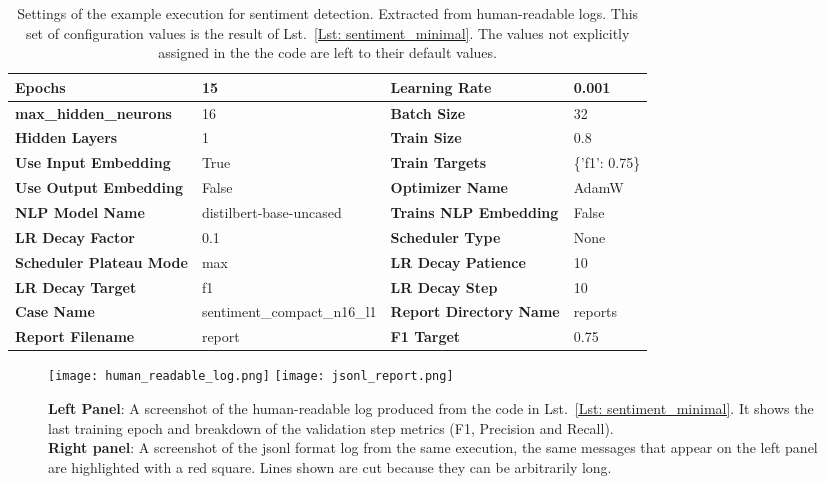 \documentclass[a4paper, 11pt]{report}
\begin{document}
\begin{table}[ht]
\footnotesize
\centering
\begin{tabular}{|p{4cm}|p{4cm}||p{4cm}|p{2.5cm}|}
\hline
\textbf{Epochs} & 15 & \textbf{Learning Rate} & 0.001 \\
\hline
\textbf{max\_hidden\_neurons} & 16 &\textbf{Batch Size} & 32 \\
\hline
\textbf{Hidden Layers }& 1 & \textbf{Train Size }& 0.8 \\
\hline
\textbf{Use Input Embedding} & True & \textbf{Train Targets} & \{'f1': 0.75\} \\
\hline
\textbf{Use Output Embedding} & False & \textbf{Optimizer Name} & AdamW \\
\hline
\textbf{NLP Model Name} & distilbert-base-uncased & \textbf{Trains NLP Embedding} & False \\
\hline
\textbf{LR Decay Factor} & 0.1 & \textbf{Scheduler Type} & None \\
\hline
\textbf{Scheduler Plateau Mode} & max & \textbf{LR Decay Patience} & 10 \\
\hline
\textbf{LR Decay Target} & f1 & \textbf{LR Decay Step} & 10 \\
\hline
\textbf{Case Name} & sentiment\_compact\_n16\_l1 & \textbf{Report Directory Name} & reports \\
\hline
\textbf{Report Filename} & report & \textbf{F1 Target} & 0.75 \\
\hline
\end{tabular}
\caption[Config parameters of small example run]{Settings of the example execution for sentiment detection. Extracted from human-readable logs. This set of configuration values is the result of Lst.~\ref{Lst: sentiment_minimal}. The values not explicitly assigned in the the code are left to their default values.}
\label{Tab: config parameters}
\end{table}

 \begin{figure}[ht!]
     \centering
     \texttt{[image: human\_readable\_log.png]}
     \texttt{[image: jsonl\_report.png]}
     \caption[Logs and reports screenshot]{\textbf{Left Panel}: A screenshot of the human-readable log produced from the code in Lst.~\ref{Lst: sentiment_minimal}. It shows the last training epoch and breakdown of the validation step metrics (F1, Precision and Recall).\\ \textbf{Right panel}: A screenshot of the jsonl format log from the same execution, the same messages that appear on the left panel are highlighted with a red square. Lines shown are cut because they can be arbitrarily long.}
     \label{fig: log_screenshots}
 \end{figure}
\end{document}
